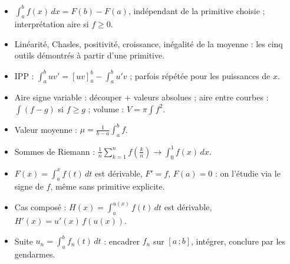 \documentclass[11pt,a4paper]{article}
\begin{document}
\vspace{4mm}
\begin{tcolorbox}[
  enhanced, boxrule=0pt, arc=2mm,
  interior style={left color=qtealdark, right color=qteal},
  left=6mm, right=6mm, top=4mm, bottom=4mm,
  fontupper=\color{white}\sffamily,
  title={\sffamily\bfseries\color{white}\ding{72}~~À retenir},
  colbacktitle=qtealdark, coltitle=white, boxrule=0pt
]
\begin{itemize}[leftmargin=6mm, label={\color{qamber}}, itemsep=1mm]
  \item $\int_a^bf(x)\,dx=F(b)-F(a)$, indépendant de la primitive choisie ; interprétation aire si $f\geq0$.
  \item Linéarité, Chasles, positivité, croissance, inégalité de la moyenne : les cinq outils démontrés à partir d'une primitive.
  \item IPP : $\int_a^buv'=[uv]_a^b-\int_a^bu'v$ ; parfois répétée pour les puissances de $x$.
  \item Aire signe variable : découper + valeurs absolues ; aire entre courbes : $\int(f-g)$ si $f\geq g$ ; volume : $V=\pi\int f^2$.
  \item Valeur moyenne : $\mu=\frac{1}{b-a}\int_a^bf$.
  \item Sommes de Riemann : $\frac1n\sum_{k=1}^nf\left(\frac kn\right) \to \int_0^1f(x)\,dx$.
  \item $F(x)=\int_a^xf(t)\,dt$ est dérivable, $F'=f$, $F(a)=0$ : on l'étudie via le signe de $f$, même sans primitive explicite.
  \item Cas composé : $H(x)=\int_a^{u(x)}f(t)\,dt$ est dérivable, $H'(x)=u'(x)\,f(u(x))$.
  \item Suite $u_n=\int_a^bf_n(t)\,dt$ : encadrer $f_n$ sur $[a\,;b]$, intégrer, conclure par les gendarmes.
\end{itemize}
\end{tcolorbox}
\end{document}
